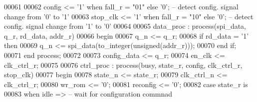 \begin{DoxyCode}
00061     
00062     config  <= '1' \textcolor{keywordflow}{when} fall\_r = "\textcolor{vhdllogic}{01}" \textcolor{keywordflow}{else} '0'; -- detect config. \textcolor{keywordflow}{signal} change from '0' \textcolor{keywordflow}{to} '1'
00063     \textcolor{vhdlchar}{stop_clk} \textcolor{vhdlchar}{<=} \textcolor{vhdlchar}{'}\textcolor{vhdllogic}{}\textcolor{vhdllogic}{1}\textcolor{vhdlchar}{'} \textcolor{keywordflow}{when} \textcolor{vhdlchar}{fall_r} \textcolor{vhdlchar}{=} \textcolor{vhdllogic}{"10"} \textcolor{keywordflow}{else} \textcolor{vhdlchar}{'}\textcolor{vhdllogic}{}\textcolor{vhdllogic}{0}\textcolor{vhdlchar}{'};\textcolor{keyword}{    -- detect config. signal change from '1' to '0'}
00064     
00065     data\_proc : \textcolor{keywordflow}{process}(spi_data, q_r, rd_data, addr_r)
00066 \textcolor{vhdlkeyword}{    begin}
00067         \textcolor{vhdlchar}{q_n} \textcolor{vhdlchar}{<=} \textcolor{vhdlchar}{q_r};
00068         \textcolor{keywordflow}{if} \textcolor{vhdlchar}{rd_data} \textcolor{vhdlchar}{=} \textcolor{vhdlchar}{'}\textcolor{vhdllogic}{}\textcolor{vhdllogic}{1}\textcolor{vhdlchar}{'} \textcolor{keywordflow}{then}
00069             \textcolor{vhdlchar}{q_n} \textcolor{vhdlchar}{<=} \textcolor{vhdlchar}{spi_data}\textcolor{vhdlchar}{(}\textcolor{vhdlchar}{to\_integer}\textcolor{vhdlchar}{(}\textcolor{comment}{unsigned}\textcolor{vhdlchar}{(}\textcolor{vhdlchar}{addr_r}\textcolor{vhdlchar}{)}\textcolor{vhdlchar}{)}\textcolor{vhdlchar}{)};
00070         \textcolor{keywordflow}{end} \textcolor{keywordflow}{if};
00071     \textcolor{keywordflow}{end} \textcolor{keywordflow}{process};
00072     
00073     config\_data <= q\_r;
00074     \textcolor{vhdlchar}{en_clk} \textcolor{vhdlchar}{<=} \textcolor{vhdlchar}{clk_ctrl_r};
00075     
00076     ctrl\_proc : \textcolor{keywordflow}{process}(busy, state_r, config, clk_ctrl_r, stop_clk)
00077 \textcolor{vhdlkeyword}{    begin}
00078         \textcolor{vhdlchar}{state_n}    \textcolor{vhdlchar}{<=} \textcolor{vhdlchar}{state_r};
00079         \textcolor{vhdlchar}{clk_ctrl_n} \textcolor{vhdlchar}{<=} \textcolor{vhdlchar}{clk_ctrl_r};
00080         \textcolor{vhdlchar}{wr_rom}   \textcolor{vhdlchar}{<=} \textcolor{vhdlchar}{'}\textcolor{vhdllogic}{}\textcolor{vhdllogic}{0}\textcolor{vhdlchar}{'};
00081         \textcolor{vhdlchar}{reconfig} \textcolor{vhdlchar}{<=} \textcolor{vhdlchar}{'}\textcolor{vhdllogic}{}\textcolor{vhdllogic}{0}\textcolor{vhdlchar}{'};
00082         \textcolor{keywordflow}{case} \textcolor{vhdlchar}{state_r} \textcolor{keywordflow}{is}
00083             \textcolor{keywordflow}{when} \textcolor{vhdlchar}{idle} \textcolor{vhdlchar}{=}\textcolor{vhdlchar}{>}\textcolor{keyword}{        -- wait for configuration commnad}

\end{DoxyCode}
